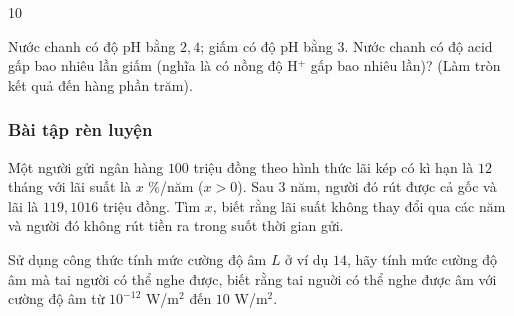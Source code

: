 \begin{indapan}{10}
\begin{vd} 
	Nước chanh có độ pH bằng $2{,}4$; giấm có độ pH bằng $3$. Nước chanh có độ acid gấp bao nhiêu lần giấm (nghĩa là có nồng độ H$^{+}$ gấp bao nhiêu lần)? (Làm tròn kết quả đến hàng phần trăm).
\end{vd}

\subsubsection{Bài tập rèn luyện} 

\begin{bt}
	Một người gửi ngân hàng $100$ triệu đồng theo hình thức lãi kép có kì hạn là $12$ tháng với lãi suất là $x$ $\%$/năm ($x>0$). Sau $3$ năm, người đó rút được cả gốc và lãi là $119{,}1016$ triệu đồng. Tìm $x$, biết rằng lãi suất không thay đổi qua các năm và người đó không rút tiền ra trong suốt thời gian gửi.
\end{bt}

\begin{bt}
	Sử dụng công thức tính mức cường độ âm $L$ ở ví dụ $14$, hãy tính mức cường độ âm mà tai người có thể nghe được, biết rằng tai nguời có thể nghe được âm với cường độ âm từ $10^{-12}$ W/m$^2$ đến $10$ W/m$^2$.
\end{bt}


\end{indapan}
